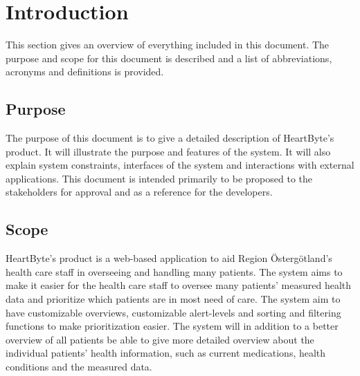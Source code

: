 \documentclass{scrreprt}
\begin{document}
\tableofcontents

\chapter{Introduction}
This section gives an overview of everything included in this document. The purpose and scope for this document is described and a list of abbreviations, acronyms and definitions is provided. 

\section{Purpose}
The purpose of this document is to give a detailed description of HeartByte's product. It will illustrate the purpose and features of the system. It will also explain system constraints, interfaces of the system and interactions with external applications. This document is intended primarily to be proposed to the stakeholders for approval and as a reference for the developers.

\section{Scope}
HeartByte's product is a web-based application to aid Region Östergötland's health care staff in overseeing and handling many patients. The system aims to make it easier for the health care staff to oversee many patients' measured health data and prioritize which patients are in most need of care. The system aim to  have customizable overviews, customizable alert-levels and sorting and filtering functions to make prioritization easier. The system will in addition to a better overview of all patients be able to give more detailed overview about the individual patients' health information, such as current medications, health conditions and the measured data. 
\end{document}
